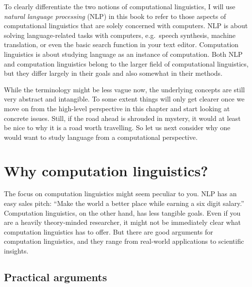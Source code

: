 To clearly differentiate the two notions of computational linguistics, I will use \emph{natural language processing} (NLP) in this book to refer to those aspects of computational linguistics that are solely concerned with computers.
NLP is about solving language-related tasks with computers, e.g.~speech synthesis, machine translation, or even the basic search function in your text editor.
Computation linguistics is about studying language as an instance of computation.
Both NLP and computation linguistics belong to the larger field of computational linguistics, but they differ largely in their goals and also somewhat in their methods.


While the terminology might be less vague now, the underlying concepts are still very abstract and intangible.
To some extent things will only get clearer once we move on from the high-level perspective in this chapter and start looking at concrete issues.
Still, if the road ahead is shrouded in mystery, it would at least be nice to why it is a road worth travelling.
So let us next consider why one would want to study language from a computational perspective. %


\section{Why computation linguistics?}
\label{sec:formal_arguments}

The focus on computation linguistics might seem peculiar to you.
NLP has an easy sales pitch: ``Make the world a better place while earning a six digit salary.''
Computation linguistics, on the other hand, has less tangible goals.
Even if you are a heavily theory-minded researcher, it might not be immediately clear what computation linguistics has to offer.
But there are good arguments for computation linguistics, and they range from real-world applications to scientific insights.

\subsection{Practical arguments}
\label{ssec:formal_arguments_practical}

